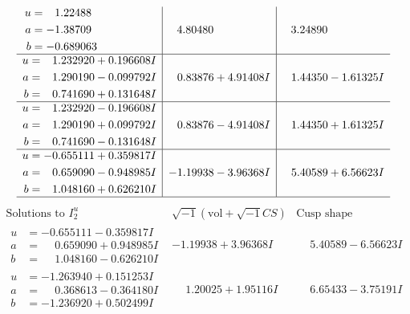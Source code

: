 \documentclass[1p]{elsarticle_modified}
\theoremstyle{definition}
\newcommand{\I}{\sqrt{-1}}
\begin{document}
$$\begin{array}{c|c|c}
\begin{aligned}
u &= \phantom{-}1.22488\phantom{ +0.000000I} \\
a &= -1.38709\phantom{ +0.000000I} \\
b &= -0.689063\phantom{ +0.000000I}\end{aligned}
 & \phantom{-}4.80480\phantom{ +0.000000I} & \phantom{-}3.24890\phantom{ +0.000000I} \\ \hline\begin{aligned}
u &= \phantom{-}1.232920 + 0.196608 I \\
a &= \phantom{-}1.290190 - 0.099792 I \\
b &= \phantom{-}0.741690 + 0.131648 I\end{aligned}
 & \phantom{-}0.83876 + 4.91408 I & \phantom{-}1.44350 - 1.61325 I \\ \hline\begin{aligned}
u &= \phantom{-}1.232920 - 0.196608 I \\
a &= \phantom{-}1.290190 + 0.099792 I \\
b &= \phantom{-}0.741690 - 0.131648 I\end{aligned}
 & \phantom{-}0.83876 - 4.91408 I & \phantom{-}1.44350 + 1.61325 I \\ \hline\begin{aligned}
u &= -0.655111 + 0.359817 I \\
a &= \phantom{-}0.659090 - 0.948985 I \\
b &= \phantom{-}1.048160 + 0.626210 I\end{aligned}
 & -1.19938 - 3.96368 I & \phantom{-}5.40589 + 6.56623 I\\
 \hline 
 \end{array}$$\newpage$$\begin{array}{c|c|c}  
\text{Solutions to }I^u_{2}& \I (\text{vol} + \sqrt{-1}CS) & \text{Cusp shape}\\
 \hline 
\begin{aligned}
u &= -0.655111 - 0.359817 I \\
a &= \phantom{-}0.659090 + 0.948985 I \\
b &= \phantom{-}1.048160 - 0.626210 I\end{aligned}
 & -1.19938 + 3.96368 I & \phantom{-}5.40589 - 6.56623 I \\ \hline\begin{aligned}
u &= -1.263940 + 0.151253 I \\
a &= \phantom{-}0.368613 - 0.364180 I \\
b &= -1.236920 + 0.502499 I\end{aligned}
 & \phantom{-}1.20025 + 1.95116 I & \phantom{-}6.65433 - 3.75191 I \\ \hline\begin{aligned}

\end{aligned}
\end{array}$$
\end{document}
